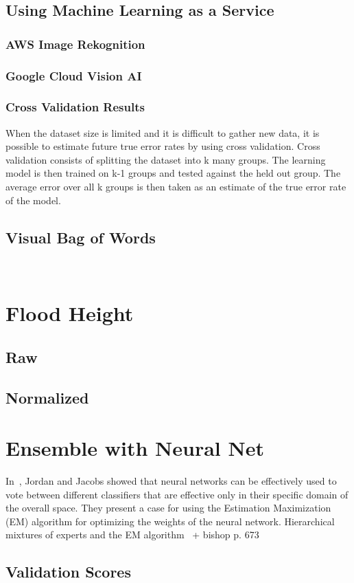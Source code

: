 \subsection{Using Machine Learning as a Service}

\subsubsection{AWS Image Rekognition}
\subsubsection{Google Cloud Vision AI}
\subsubsection{Cross Validation Results}
When the dataset size is limited and it is difficult to gather new data, 
it is possible to estimate future true error rates by using
cross validation. Cross validation consists of splitting the dataset into
k many groups. The learning model is then trained on k-1 groups and tested 
against the held out group. The average error over all k groups is then 
taken as an estimate of the true error rate of the model.

\subsection{Visual Bag of Words}
~\cite{yangEvaluatingBagofvisualwordsRepresentations2007}

\section{Flood Height}
\subsection{Raw}
\subsection{Normalized}
\section{Ensemble with Neural Net}
In~\cite{jordanHierarchicalMixturesExperts1994}, Jordan and Jacobs showed that
neural networks can be effectively used to vote between different classifiers
that are effective only in their specific domain of the overall space. They present a
case for using the Estimation Maximization (EM) algorithm for optimizing the
weights of the neural network.
Hierarchical mixtures of experts and the EM
algorithm~\cite{jordanHierarchicalMixturesExperts1994}
+ bishop p. 673~\cite{bishopPatternRecognitionMachine2006}


\subsection{Validation Scores}